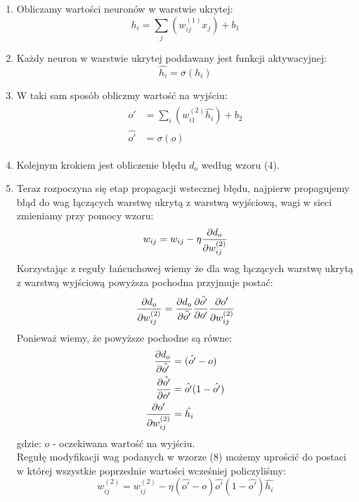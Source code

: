 \documentclass{article}
\begin{document}
\begin{enumerate}
\item Obliczamy wartości neuronów  w warstwie ukrytej:
\begin{equation}
	h_i = \sum_{j} (w_{ij}^{(1)}x_j) + b_1
\end{equation}
\item Każdy neuron w warstwie ukrytej poddawany jest funkcji aktywacyjnej:
\begin{equation}
	\hat{h_i} = \sigma(h_i)
\end{equation}
\item W taki sam sposób obliczmy wartość na wyjściu:
\begin{align}
\begin{split}
	o' &= \sum_{i} (w_{i1}^{(2)}\hat{h_i}) + b_2\\
	\hat{o'} &= \sigma(o)
\end{split}
\end{align}
\item Kolejnym krokiem jest obliczenie błędu $d_o$ według wzoru (4). 
\item Teraz rozpoczyna się etap propagacji wstecznej błędu, najpierw propagujemy błąd
do wag łączących warstwę ukrytą z warstwą wyjściową, wagi w sieci zmieniamy przy pomocy wzoru:
\begin{equation}
	w_{ij} = w_{ij} - \eta \pdv{d_o}{w_{ij}^{(2)}}
\end{equation}
Korzystając z reguły łańcuchowej wiemy że dla wag łączących warstwę ukrytą z warstwą wyjściową
powyższa pochodna przyjmuje postać:
\begin{equation}
	\pdv{d_o}{w_{ij}^{(2)}} = \pdv{d_o}{\hat{o'}} \pdv{\hat{o'}}{o'} \pdv{o'}{w_{ij}^{(2)}}
\end{equation}
Ponieważ wiemy, że powyższe pochodne są równe:
\begin{align}
\begin{split} 
	\pdv{d_o}{\hat{o'}} &= (\hat{o'} - o) \\
	\pdv{\hat{o'}}{o'} &=\hat{o'}(1 - \hat{o'}) \\
	\pdv{o'}{w_{ij}^{(2)}} &= \hat{h_i}
\end{split}
\end{align}
gdzie: $o$ - oczekiwana wartość na wyjściu.\\
Regułę modyfikacji wag podanych w wzorze (8) możemy uprościć do postaci w której
wszystkie poprzednie wartości wcześniej policzyliśmy:
\begin{equation}
	w_{ij}^{(2)} = w_{ij}^{(2)} - \eta(\hat{o'} - o)\hat{o'}(1 - \hat{o'})\hat{h_i}

\end{equation}
\end{enumerate}
\end{document}
